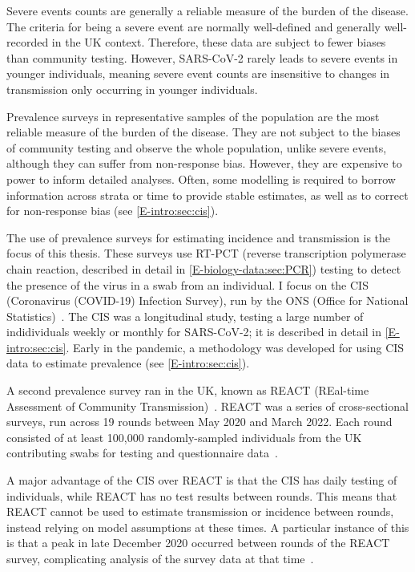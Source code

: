 \documentclass[thesis.tex]{subfiles}
\begin{document}
Severe events counts are generally a reliable measure of the burden of the disease.
The criteria for being a severe event are normally well-defined and generally well-recorded in the UK context.
Therefore, these data are subject to fewer biases than community testing.
However, SARS-CoV-2 rarely leads to severe events in younger individuals, meaning severe event counts are insensitive to changes in transmission only occurring in younger individuals.

Prevalence surveys in representative samples of the population are the most reliable measure of the burden of the disease.
They are not subject to the biases of community testing and observe the whole population, unlike severe events, although they can suffer from non-response bias.
However, they are expensive to power to inform detailed analyses.
Often, some modelling is required to borrow information across strata or time to provide stable estimates, as well as to correct for non-response bias (see \cref{E-intro:sec:cis}).

The use of prevalence surveys for estimating incidence and transmission is the focus of this thesis.
These surveys use RT-PCT (reverse transcription polymerase chain reaction, described in detail in \cref{E-biology-data:sec:PCR}) testing to detect the presence of the virus in a swab from an individual.
I focus on the CIS (Coronavirus (COVID-19) Infection Survey), run by the ONS (Office for National Statistics)~\autocite{CIS,cisMethodsONS}.
The CIS was a longitudinal study, testing a large number of indidividuals weekly or monthly for SARS-CoV-2; it is described in detail in \cref{E-intro:sec:cis}.
Early in the pandemic, a methodology was developed for using CIS data to estimate prevalence (see \cref{E-intro:sec:cis}).

A second prevalence survey ran in the UK, known as REACT (REal-time Assessment of Community Transmission)~\autocite{rileyResurgence,rileyREACT}.
REACT was a series of cross-sectional surveys, run across 19 rounds between May 2020 and March 2022.
Each round consisted of at least 100,000 randomly-sampled individuals from the UK contributing swabs for testing and questionnaire data~\autocite{elliottTwin}.

A major advantage of the CIS over REACT is that the CIS has daily testing of individuals, while REACT has no test results between rounds.
This means that REACT cannot be used to estimate transmission or incidence between rounds, instead relying on model assumptions at these times.
A particular instance of this is that a peak in late December 2020 occurred between rounds of the REACT survey, complicating analysis of the survey data at that time~\autocite{rileyREACTround8}.
\end{document}
